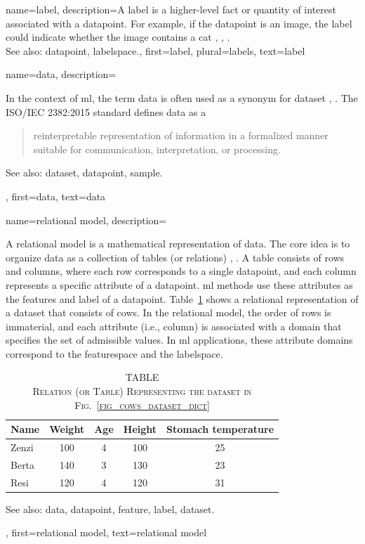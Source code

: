 {name={label},
	description={A label is a higher-level fact or quantity of interest associated 
		with a \gls{datapoint}. For example, if the \gls{datapoint} is an image, the label 
		could indicate whether the image contains a cat 
		\cite{Everitt2010}, \cite{Gujarati2021}, \cite{Dodge2003}.
				\\
		See also: \gls{datapoint}, \gls{labelspace}.},
	first={label},
	plural={labels},
	text={label}  
}

{name={data},
	description={In the context of \gls{ml}, the term 
 		data is often used as a synonym for \gls{dataset}
  		\cite{Everitt2010}, \cite{OxfordStatisticsDictionary}. 
  		The ISO/IEC 2382:2015 standard \cite{ISO2382} defines data as a \begin{quote} reinterpretable representation of 
  		information in a formalized manner suitable for communication, interpretation, or processing.\end{quote}
  		See also: \gls{dataset}, \gls{datapoint}, \gls{sample}.}, 
  	first={data},
	text={data}
}

{name={relational model},
	description={A relational \gls{model} is a mathematical representation of \gls{data}. 
		The core idea is to organize \gls{data} as a collection of 
		tables (or relations) \cite{silberschatz2019database}, \cite{codd1970relational}. 
		A table consists of rows and columns, where each 
		row corresponds to a single \gls{datapoint}, and each 
		column represents a specific attribute of a \gls{datapoint}. 
		\gls{ml} methods use these attributes as the \glspl{feature} 
		and \gls{label} of a \gls{datapoint}. Table~\ref{tab:relmodel_dict} shows 
		a relational representation of a \gls{dataset} that consists of cows. 
		In the relational \gls{model}, the order of rows is immaterial, and each 
		attribute (i.e., column) is associated with a \gls{domain} that specifies the set 
		of admissible values. 
		In \gls{ml} applications, these attribute \glspl{domain} correspond to the 
		\gls{featurespace} and the \gls{labelspace}.
				\begin{table}[H]
					\caption*{
						\centering 
						\scshape TABLE \thetable \\[0.5ex]
						\scshape Relation (or Table) Representing the \gls{dataset} in Fig.\ \ref{fig_cows_dataset_dict} 
					}
					\label{tab:relmodel_dict} 
					\centering
					\begin{tabular}{lcccc}
						\hline
						\textbf{Name} & \textbf{Weight} & \textbf{Age} & \textbf{Height} & \textbf{Stomach temperature} \\
						\hline
						Zenzi & 100 & 4 & 100 & 25 \\
						Berta & 140 & 3 & 130 & 23 \\
						Resi  & 120 & 4 & 120 & 31 \\
						\hline
					\end{tabular}
				\end{table}
		See also: \gls{data}, \gls{datapoint}, \gls{feature}, \gls{label}, \gls{dataset}.}, 
	first={relational model},
	text={relational model}
}
  		
